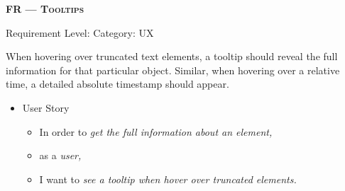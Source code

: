 \centerline{\textbf{FR\textsubscript{} --- \textsc{Tooltips}}}
\centerline{\small Requirement Level:  \quad{} Category: \acrshort*{UX}}

\noindent When hovering over truncated text elements, a tooltip should reveal the full information for that particular object. Similar, when hovering over a relative time, a detailed absolute timestamp should appear.

\begin{itemize}[after=\vspace{1em}]
    \setlength\itemsep{-0.5em}
	\item[] User Story\\[-7.8mm]
	\begin{itemize}
    \setlength\itemsep{-0.5em}
        \item[] In order to \textit{get the full information about an element,}
        \item[] as a \textit{user,}
        \item[] I want to \textit{see a tooltip when hover over truncated elements.}
    \end{itemize}
\end{itemize}


